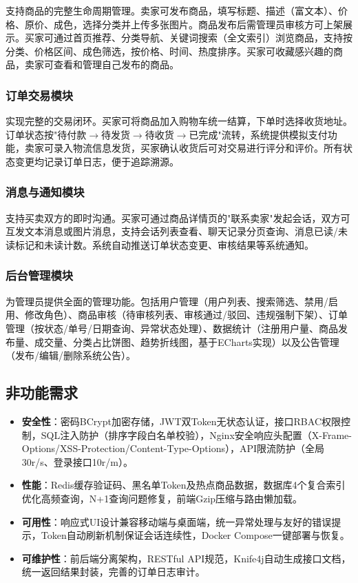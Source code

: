 \documentclass[12pt,a4paper,oneside]{ctexart}
\begin{document}
支持商品的完整生命周期管理。卖家可发布商品，填写标题、描述（富文本）、价格、原价、成色，选择分类并上传多张图片。商品发布后需管理员审核方可上架展示。买家可通过首页推荐、分类导航、关键词搜索（全文索引）浏览商品，支持按分类、价格区间、成色筛选，按价格、时间、热度排序。买家可收藏感兴趣的商品，卖家可查看和管理自己发布的商品。

\subsubsection{订单交易模块}

实现完整的交易闭环。买家可将商品加入购物车统一结算，下单时选择收货地址。订单状态按"待付款$\to$待发货$\to$待收货$\to$已完成"流转，系统提供模拟支付功能，卖家可录入物流信息发货，买家确认收货后可对交易进行评分和评价。所有状态变更均记录订单日志，便于追踪溯源。

\subsubsection{消息与通知模块}

支持买卖双方的即时沟通。买家可通过商品详情页的"联系卖家"发起会话，双方可互发文本消息或图片消息，支持会话列表查看、聊天记录分页查询、消息已读/未读标记和未读计数。系统自动推送订单状态变更、审核结果等系统通知。

\subsubsection{后台管理模块}

为管理员提供全面的管理功能。包括用户管理（用户列表、搜索筛选、禁用/启用、修改角色）、商品审核（待审核列表、审核通过/驳回、违规强制下架）、订单管理（按状态/单号/日期查询、异常状态处理）、数据统计（注册用户量、商品发布量、成交量、分类占比饼图、趋势折线图，基于ECharts实现）以及公告管理（发布/编辑/删除系统公告）。

\subsection{非功能需求}

\begin{itemize}[nosep]
    \item \textbf{安全性}：密码BCrypt加密存储，JWT双Token无状态认证，接口RBAC权限控制，SQL注入防护（排序字段白名单校验），Nginx安全响应头配置（X-Frame-Options/XSS-Protection/Content-Type-Options），API限流防护（全局30r/s、登录接口10r/m）。
    \item \textbf{性能}：Redis缓存验证码、黑名单Token及热点商品数据，数据库4个复合索引优化高频查询，N+1查询问题修复，前端Gzip压缩与路由懒加载。
    \item \textbf{可用性}：响应式UI设计兼容移动端与桌面端，统一异常处理与友好的错误提示，Token自动刷新机制保证会话连续性，Docker Compose一键部署与恢复。
    \item \textbf{可维护性}：前后端分离架构，RESTful API规范，Knife4j自动生成接口文档，统一返回结果封装，完善的订单日志审计。
\end{itemize}
\end{document}
